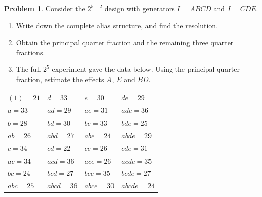 \documentclass[11pt,a4paper]{article}
\numberwithin{equation}{section}
\theoremstyle{definition}
\newtheorem{problemx}{Problem}[subsection]
\newenvironment{problem}{\begin{problemx}}{\end{problemx}}
\begin{document}
\begin{problem}
Consider the $2^{5-2}$ design with generators $I = ABCD$ and $I = CDE$.
\begin{enumerate}[label=(\alph*)]
\item Write down the complete alias structure, and find the resolution.
\item Obtain the principal quarter fraction and the remaining three quarter fractions.
\item The full $2^5$ experiment gave the data below. Using the principal quarter fraction, estimate the effects $A$, $E$ and $BD$.
\end{enumerate}
\begin{center}
\begin{tabular}{llll}
$(1) = 21$ & $d = 33$ & $e = 30$ & $de = 29$ \\
$a = 33$ & $ad = 29$ & $ae = 31$ & $ade = 36$ \\
$b = 28$ & $bd = 30$ & $be = 33$ & $bde = 25$ \\
$ab = 26$ & $abd = 27$ & $abe = 24$ & $abde = 29$ \\
$c = 34$ & $cd = 22$ & $ce = 26$ & $cde = 31$ \\
$ac = 34$ & $acd = 36$ & $ace = 26$ & $acde = 35$ \\
$bc = 24$ & $bcd = 27$ & $bce = 35$ & $bcde = 27$ \\
$abc = 25$ & $abcd = 36$ & $abce = 30$ & $abcde = 24$
\end{tabular}
\end{center}
\end{problem}
\end{document}

